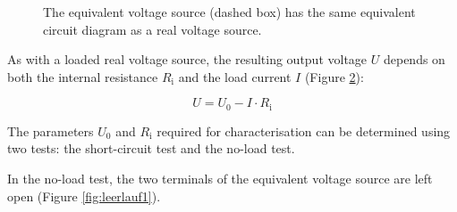 \begin{frame}
{\begin{figure}[h!]
			\begin{center}

				
			\end{center}
			\caption{The equivalent voltage source (dashed box) has the same equivalent circuit diagram as a real voltage source.}
			
			
			\label{fig:testiiiii}
			
			
		\end{figure}
		
		
		
		
		
		As with a loaded real voltage source, the resulting output voltage $U$
		depends on both the internal resistance $R_\mathrm{i}$ and the load current $I$ (Figure \ref{fig:kennliniespannung}):
		
		\begin{equation*}
			U = U_0 - I \cdot R_\mathrm{i}
		\end{equation*}
		
		\begin{figure}[h!]
			\renewcommand{\figurename}{Figure}
			\centering
			\s{}
			
			\label{fig:kennliniespannung}
		\end{figure}
		
		
		
		
		The parameters $U_0$ and $R_\mathrm{i}$ required for characterisation can be determined using two
		tests: the short-circuit test and the no-load test.

		In the no-load test, the two terminals of the equivalent voltage source are left open (Figure \ref{fig:leerlauf1}). 
		
		\begin{figure}[h!]
			\renewcommand{\figurename}{Figure}
			\begin{center}


\end{center}
\end{figure}}
\end{frame}
